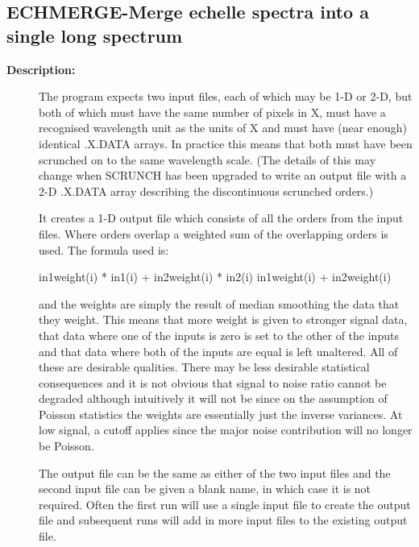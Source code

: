 \subsection{ECHMERGE-\label{ECHMERGE}Merge echelle spectra into a single long spectrum}
\begin{description}

\item [{\bf Description:}]
 The program expects two input files, each of which may be 1-D or
 2-D, but both of which must have the same number of pixels in X,
 must have a recognised wavelength unit as the units of X and must
 have (near enough) identical .X.DATA arrays. In practice this
 means that both must have been scrunched on to the same wavelength
 scale. (The details of this may change when SCRUNCH has been
 upgraded to write an output file with a 2-D .X.DATA array
 describing the discontinuous scrunched orders.)

 It creates a 1-D output file which consists of all the orders from
 the input files. Where orders overlap a weighted sum of the
 overlapping orders is used. The formula used is:

    in1weight(i) * in1(i) + in2weight(i) * in2(i)
             in1weight(i) + in2weight(i)

 and the weights are simply the result of median smoothing the data
 that they weight. This means that more weight is given to stronger
 signal data, that data where one of the inputs is zero is set to
 the other of the inputs and that data where both of the inputs are
 equal is left unaltered. All of these are desirable qualities.
 There may be less desirable statistical consequences and it is not
 obvious that signal to noise ratio cannot be degraded although
 intuitively it will not be since on the assumption of Poisson
 statistics the weights are essentially just the inverse variances.
 At low signal, a cutoff applies since the major noise contribution
 will no longer be Poisson.

 The output file can be the same as either of the two input files
 and the second input file can be given a blank name, in which case
 it is not required. Often the first run will use a single input
 file to create the output file and subsequent runs will add in
 more input files to the existing output file.



\end{description}
